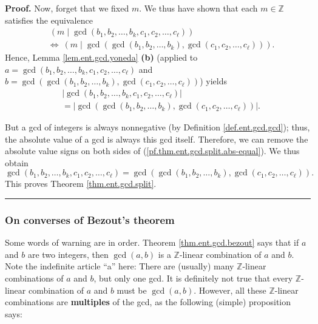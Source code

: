 \documentclass[numbers=enddot,12pt,final,onecolumn,notitlepage]{scrartcl}%
\numberwithin{exer}{subsection}
\theoremstyle{definition}
\newenvironment{proof}[1][Proof]{\noindent\textbf{#1.} }{\ \rule{0.5em}{0.5em}}
\begin{document}
\begin{proof}
Now, forget that we fixed $m$. We thus have shown that each $m\in\mathbb{Z}$
satisfies the equivalence%
\begin{align*}
&  \ \left(  m\mid\gcd\left(  b_{1},b_{2},\ldots,b_{k},c_{1},c_{2}%
,\ldots,c_{\ell}\right)  \right) \\
&  \Longleftrightarrow\ \left(  m\mid\gcd\left(  \gcd\left(  b_{1}%
,b_{2},\ldots,b_{k}\right)  ,\gcd\left(  c_{1},c_{2},\ldots,c_{\ell}\right)
\right)  \right)  .
\end{align*}
Hence, Lemma \ref{lem.ent.gcd.yoneda} \textbf{(b)} (applied to $a=\gcd\left(
b_{1},b_{2},\ldots,b_{k},c_{1},c_{2},\ldots,c_{\ell}\right)  $ and
\newline$b=\gcd\left(  \gcd\left(  b_{1},b_{2},\ldots,b_{k}\right)
,\gcd\left(  c_{1},c_{2},\ldots,c_{\ell}\right)  \right)  $) yields%
\begin{align}
&  \left\vert \gcd\left(  b_{1},b_{2},\ldots,b_{k},c_{1},c_{2},\ldots,c_{\ell
}\right)  \right\vert \nonumber\\
&  =\left\vert \gcd\left(  \gcd\left(  b_{1},b_{2},\ldots,b_{k}\right)
,\gcd\left(  c_{1},c_{2},\ldots,c_{\ell}\right)  \right)  \right\vert .
\label{pf.thm.ent.gcd.split.abs-equal}%
\end{align}


But a gcd of integers is always nonnegative (by Definition
\ref{def.ent.gcd.gcd}); thus, the absolute value of a gcd is always this gcd
itself. Therefore, we can remove the absolute value signs on both sides of
(\ref{pf.thm.ent.gcd.split.abs-equal}). We thus obtain%
\[
\gcd\left(  b_{1},b_{2},\ldots,b_{k},c_{1},c_{2},\ldots,c_{\ell}\right)
=\gcd\left(  \gcd\left(  b_{1},b_{2},\ldots,b_{k}\right)  ,\gcd\left(
c_{1},c_{2},\ldots,c_{\ell}\right)  \right)  .
\]
This proves Theorem \ref{thm.ent.gcd.split}.
\end{proof}

\subsubsection{On converses of Bezout's theorem}

Some words of warning are in order. Theorem \ref{thm.ent.gcd.bezout} says that
if $a$ and $b$ are two integers, then $\gcd\left(  a, b \right)  $ is a
$\mathbb{Z}$-linear combination of $a$ and $b$. Note the indefinite article
``a'' here: There are (usually) many $\mathbb{Z}$-linear combinations of $a$
and $b$, but only one gcd. It is definitely not true that every $\mathbb{Z}%
$-linear combination of $a$ and $b$ must be $\gcd\left(  a, b \right)  $.
However, all these $\mathbb{Z}$-linear combinations are \textbf{multiples} of
the gcd, as the following (simple) proposition says:
\end{document}
